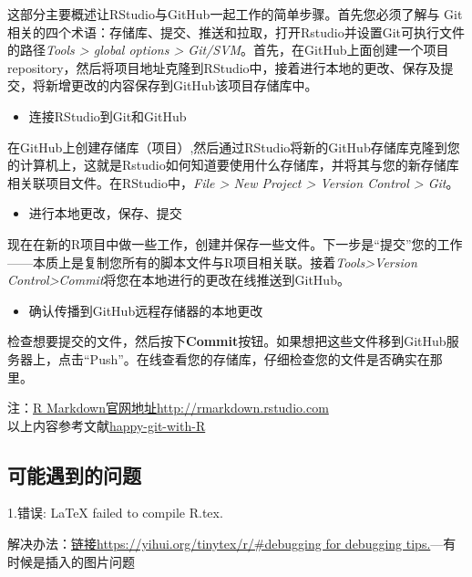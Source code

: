 \documentclass[
]{book}
\providecommand{\tightlist}{%
  \setlength{\itemsep}{0pt}\setlength{\parskip}{0pt}}
\begin{document}
这部分主要概述让RStudio与GitHub一起工作的简单步骤。首先您必须了解与 Git 相关的四个术语：存储库、提交、推送和拉取，打开Rstudio并设置Git可执行文件的路径\emph{Tools \textgreater{} global options \textgreater{} Git/SVM}。首先，在GitHub上面创建一个项目repository，然后将项目地址克隆到RStudio中，接着进行本地的更改、保存及提交，将新增更改的内容保存到GitHub该项目存储库中。

\begin{itemize}
\tightlist
\item
  连接RStudio到Git和GitHub
\end{itemize}

在GitHub上创建存储库（项目）,然后通过RStudio将新的GitHub存储库克隆到您的计算机上，这就是Rstudio如何知道要使用什么存储库，并将其与您的新存储库相关联项目文件。在RStudio中，\emph{File \textgreater{} New Project \textgreater{} Version Control \textgreater{} Git}。

\begin{itemize}
\tightlist
\item
  进行本地更改，保存、提交
\end{itemize}

现在在新的R项目中做一些工作，创建并保存一些文件。下一步是``提交''您的工作------本质上是复制您所有的脚本文件与R项目相关联。接着\emph{Tools\textgreater Version Control\textgreater Commit}将您在本地进行的更改在线推送到GitHub。

\begin{itemize}
\tightlist
\item
  确认传播到GitHub远程存储器的本地更改
\end{itemize}

检查想要提交的文件，然后按下\textbf{Commit}按钮。如果想把这些文件移到GitHub服务器上，点击``Push''。在线查看您的存储库，仔细检查您的文件是否确实在那里。

注：\href{http://rmarkdown.rstudio.com}{R Markdown官网地址http://rmarkdown.rstudio.com}\\
以上内容参考文献\href{https://happygitwithr.com/}{happy-git-with-R}

\hypertarget{ux53efux80fdux9047ux5230ux7684ux95eeux9898}{%
\subsection{可能遇到的问题}\label{ux53efux80fdux9047ux5230ux7684ux95eeux9898}}

1.错误: LaTeX failed to compile R.tex.

解决办法：\href{https://yihui.org/tinytex/r/\#debugging\%20for\%20debugging\%20tips.}{链接https://yihui.org/tinytex/r/\#debugging for debugging tips.}---有时候是插入的图片问题
\end{document}
